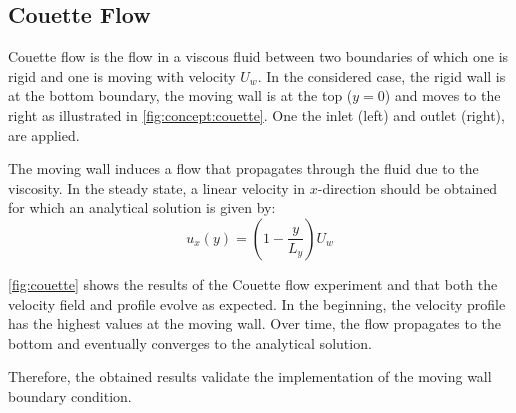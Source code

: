 \subsection{Couette Flow}

Couette flow is the flow in a viscous fluid between two boundaries of which one is rigid and one is moving with velocity $U_w$. In the considered case, the rigid wall is at the bottom boundary, the moving wall is at the top ($y=0$) and moves to the right as illustrated in \cref{fig:concept:couette}. One the inlet (left) and outlet (right),  are applied.

The moving wall induces a flow that propagates through the fluid due to the viscosity. In the steady state, a linear velocity in $x$-direction should be obtained for which an analytical solution is given by:
\begin{equation}
    u_x(y) = \left(1-\frac{y}{L_y}\right) U_w
    \label{eq:couette:analytical-solution}
\end{equation}

\cref{fig:couette} shows the results of the Couette flow experiment and that both the velocity field and profile evolve as expected. In the beginning, the velocity profile has the highest values at the moving wall. Over time, the flow propagates to the bottom and eventually converges to the analytical solution.

Therefore, the obtained results validate the implementation of the moving wall boundary condition.

